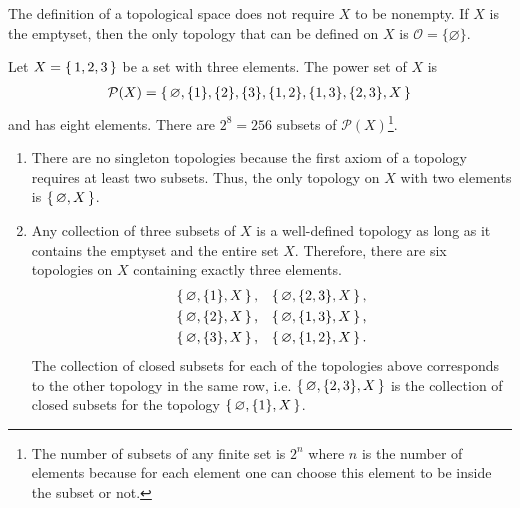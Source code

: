 %
\begin{rembox}
    \begin{remark}
        The definition of a topological space does not require \(X\) to be nonempty. If \(X\) is the emptyset, then the only topology that can be defined on \(X\) is \(\mathcal{O} = \{\varnothing\}\).
    \end{remark}
\end{rembox}
%
\begin{example}
    Let \(X = \left\{\, 1, 2, 3 \,\right\}\) be a set with three elements. The power set of \(X\) is
    \begin{align*}
        \mathcal{P}(X) = \left\{\, \varnothing, \{1\}, \{2\}, \{3\}, \{1, 2\}, \{1, 3\}, \{2, 3\}, X \,\right\}
    \end{align*}
    and has eight elements. There are \(2^8 = 256\) subsets of \(\mathcal{P}(X)\)\footnote{The number of subsets of any finite set is \(2^n\) where \(n\) is the number of elements because for each element one can choose this element to be inside the subset or not.}.
    \begin{enumerate}
        \item There are no singleton topologies because the first axiom of a topology requires at least two subsets. Thus, the only topology on \(X\) with two elements is \(\left\{\, \varnothing, X \,\right\}\).
        \item Any collection of three subsets of \(X\) is a well-defined topology as long as it contains the emptyset and the entire set \(X\). Therefore, there are six topologies on \(X\) containing exactly three elements.
        \begin{align*}
            \left\{\, \varnothing, \{1\}, X \,\right\} \text{,} & & \left\{\, \varnothing, \{2, 3\}, X \,\right\} \text{,}\\
            \left\{\, \varnothing, \{2\}, X \,\right\} \text{,} & & \left\{\, \varnothing, \{1, 3\}, X \,\right\} \text{,}\\
            \left\{\, \varnothing, \{3\}, X \,\right\} \text{,} & & \left\{\, \varnothing, \{1, 2\}, X \,\right\} \text{.}
        \end{align*}
        The collection of closed subsets for each of the topologies above corresponds to the other topology in the same row, i.e. \(\left\{\, \varnothing, \{2, 3\}, X \,\right\}\) is the collection of closed subsets for the topology \(\left\{\, \varnothing, \{1\}, X \,\right\}\).
        

\end{enumerate}
\end{example}
